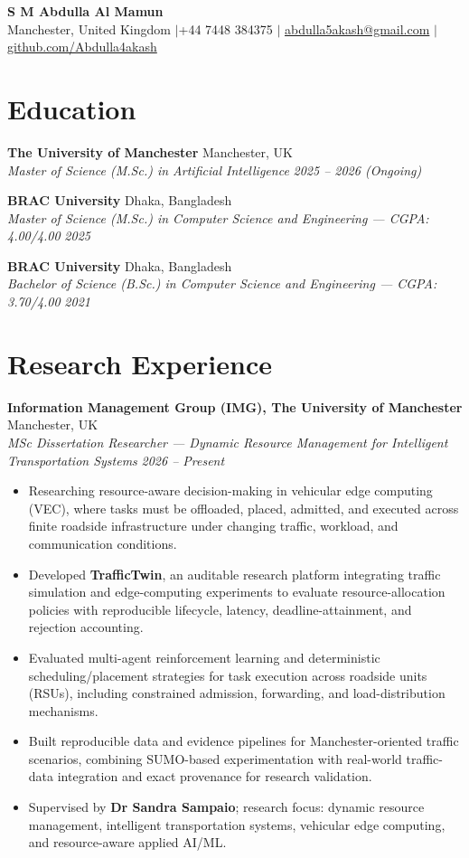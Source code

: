 \documentclass[a4paper,10pt]{article}
\newcommand{\entry}[4]{%
  \noindent\textbf{#1} \hfill #2\\
  \textit{#3} \hfill \textit{#4}\par\vspace{2pt}
}
\begin{document}
\begin{center}
  {\LARGE \textbf{S M Abdulla Al Mamun}}\\[4pt]
  Manchester, United Kingdom \enspace$|$\enspace +44 7448 384375 \enspace$|$\enspace
  \href{mailto:abdulla5akash@gmail.com}{abdulla5akash@gmail.com} \enspace$|$\enspace
  \href{https://github.com/Abdulla4akash}{github.com/Abdulla4akash}
\end{center}

\section{Education}
\entry{The University of Manchester}{Manchester, UK}{Master of Science (M.Sc.) in Artificial Intelligence}{2025 -- 2026 (Ongoing)}

\entry{BRAC University}{Dhaka, Bangladesh}{Master of Science (M.Sc.) in Computer Science and Engineering --- CGPA: 4.00/4.00}{2025}

\entry{BRAC University}{Dhaka, Bangladesh}{Bachelor of Science (B.Sc.) in Computer Science and Engineering --- CGPA: 3.70/4.00}{2021}

\section{Research Experience}
\entry{Information Management Group (IMG), The University of Manchester}{Manchester, UK}{MSc Dissertation Researcher --- Dynamic Resource Management for Intelligent Transportation Systems}{2026 -- Present}
\begin{itemize}
  \item Researching resource-aware decision-making in vehicular edge computing (VEC), where tasks must be offloaded, placed, admitted, and executed across finite roadside infrastructure under changing traffic, workload, and communication conditions.
  \item Developed \textbf{TrafficTwin}, an auditable research platform integrating traffic simulation and edge-computing experiments to evaluate resource-allocation policies with reproducible lifecycle, latency, deadline-attainment, and rejection accounting.
  \item Evaluated multi-agent reinforcement learning and deterministic scheduling/placement strategies for task execution across roadside units (RSUs), including constrained admission, forwarding, and load-distribution mechanisms.
  \item Built reproducible data and evidence pipelines for Manchester-oriented traffic scenarios, combining SUMO-based experimentation with real-world traffic-data integration and exact provenance for research validation.
  \item Supervised by \textbf{Dr Sandra Sampaio}; research focus: dynamic resource management, intelligent transportation systems, vehicular edge computing, and resource-aware applied AI/ML.
\end{itemize}
\end{document}
